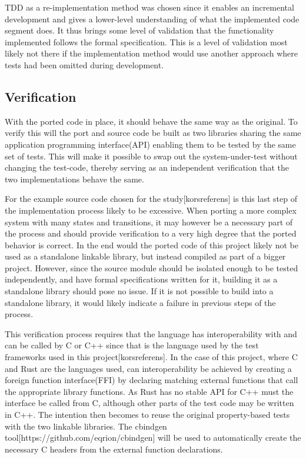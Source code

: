 \documentclass{article}
\begin{document}
TDD as a re-implementation method was chosen since it enables an incremental development and gives a lower-level understanding of what the implemented code segment does. It thus brings some level of validation that the functionality implemented follows the formal specification. This is a level of validation most likely not there if the implementation method would use another approach where tests had been omitted during development. 

\subsection{Verification}\label{verification}

With the ported code in place, it should behave the same way as the original. To verify this will the port and source code be built as two libraries sharing the same application programming interface(API) enabling them to be tested by the same set of tests. This will make it possible to swap out the system-under-test without changing the test-code, thereby serving as an independent verification that the two implementations behave the same. 

For the example source code chosen for the study[korsreferens] is this last step of the implementation process likely to be excessive. When porting a more complex system with many states and transitions, it may however be a necessary part of the process and should provide verification to a very high degree that the ported behavior is correct. In the end would the ported code of this project likely not be used as a standalone linkable library, but instead compiled as part of a bigger project. However, since the source module should be isolated enough to be tested independently, and have formal specifications written for it, building it as a standalone library should pose no issue. If it is not possible to build into a standalone library, it would likely indicate a failure in previous steps of the process. 

This verification process requires that the language has interoperability with and can be called by C or C++ since that is the language used by the test frameworks used in this project[korsreferens]. In the case of this project, where C and Rust are the languages used, can interoperability be achieved by creating a foreign function interface(FFI) by declaring matching external functions that call the appropriate library functions. As Rust has no stable API for C++ must the interface be called from C, although other parts of the test code may be written in C++. The intention then becomes to reuse the original property-based tests with the two linkable libraries. The cbindgen tool[https://github.com/eqrion/cbindgen] will be used to automatically create the necessary C headers from the external function declarations.
\end{document}
